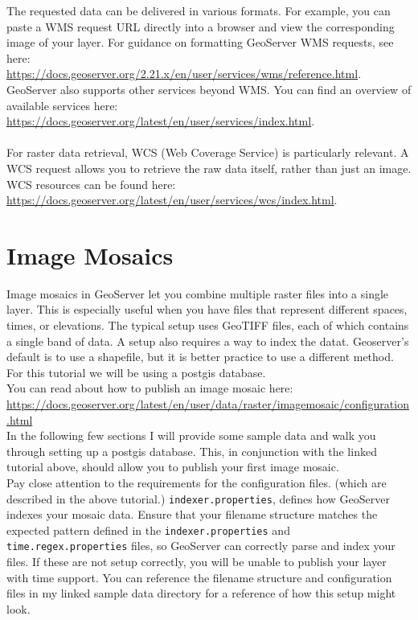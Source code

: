 \documentclass{article}
\begin{document}
The requested data can be delivered in various formats. For example, you can paste a WMS request URL directly into a browser and view the corresponding image of your layer. For guidance on formatting GeoServer WMS requests, see here: \\ \url{https://docs.geoserver.org/2.21.x/en/user/services/wms/reference.html}. \\

GeoServer also supports other services beyond WMS. You can find an overview of available services here: \\ \url{https://docs.geoserver.org/latest/en/user/services/index.html}.
\\
\\
For raster data retrieval, WCS (Web Coverage Service) is particularly relevant. A WCS request allows you to retrieve the raw data itself, rather than just an image. WCS resources can be found here: \url{https://docs.geoserver.org/latest/en/user/services/wcs/index.html}.



\section{Image Mosaics}


Image mosaics in GeoServer let you combine multiple raster files into a single layer. This is especially useful when you have files that represent different spaces, times, or elevations. The typical setup uses GeoTIFF files, each of which contains a single band of data. A setup also requires a way to index the datat. Geoserver's default is to use a shapefile, but it is better practice to use a different method. For this tutorial we will be using a postgis database.\\

You can read about how to publish an image mosaic here:  \\
\url{https://docs.geoserver.org/latest/en/user/data/raster/imagemosaic/configuration.html}
\\

In the following few sections I will provide some sample data and walk you through setting up a postgis database. This, in conjunction with the linked tutorial above, should allow you to publish your first image mosaic.
\\

Pay close attention to the requirements for the configuration files.  (which are described in the above tutorial.) \texttt{indexer.properties}, defines how GeoServer indexes your mosaic data. Ensure that your filename structure matches the expected pattern defined in the \texttt{indexer.properties} and \texttt{time.regex.properties} files, so GeoServer can correctly parse and index your files. If these are not setup correctly, you will be unable to publish your layer with time support. You can reference the filename structure and configuration files in my linked sample data directory for a reference of how this setup might look. \\ 
\end{document}
